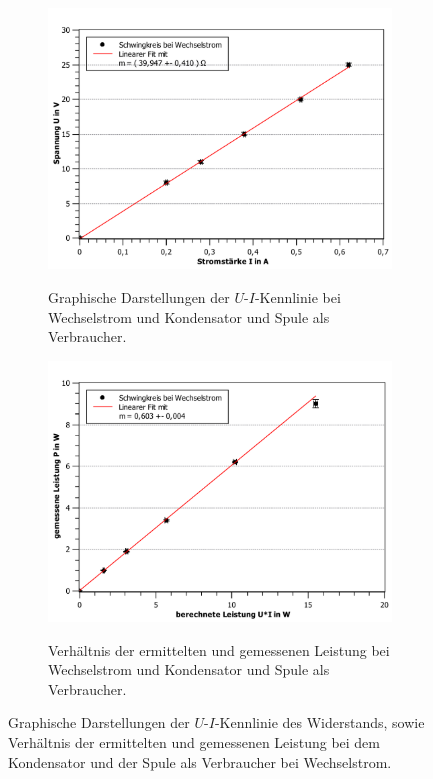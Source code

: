 \begin{figure}[ht]
	\label{fig:schwing_wechsel}
	\centering	
	\begin{subfigure}{0.70\textwidth}
		\centering
		\includegraphics[width=\textwidth]{auswertung/kondensator-wechsel-Widerstand.pdf}
		\label{fig:9}
		\caption{Graphische Darstellungen der $U$-$I$-Kennlinie bei Wechselstrom und Kondensator und Spule als Verbraucher.}	
	\end{subfigure}
	\begin{subfigure}{0.70\textwidth}
		\centering
		\includegraphics[width=\textwidth]{auswertung/kondensator-wechsel-Leistung.pdf}
		\label{fig:10}
		\caption{Verhältnis der ermittelten und gemessenen Leistung bei Wechselstrom und Kondensator und Spule als Verbraucher.}	
	\end{subfigure}
	\caption{Graphische Darstellungen der $U$-$I$-Kennlinie des Widerstands, sowie Verhältnis der ermittelten und gemessenen Leistung bei dem Kondensator und der Spule als Verbraucher bei Wechselstrom.}
\end{figure}
